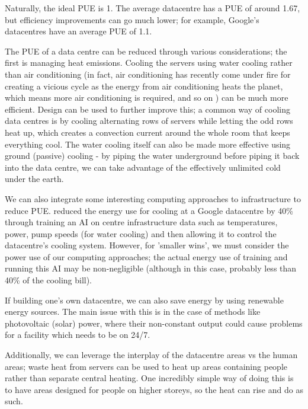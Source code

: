 \documentclass{article}
\begin{document}
Naturally, the ideal PUE is 1. The average datacentre has a PUE of around 1.67, but efficiency improvements can go much lower; for example, Google's datacentres have an average PUE of 1.1. \citep{holzle2020data}\newline

The PUE of a data centre can be reduced through various considerations; the first is managing heat emissions. Cooling the servers using water cooling rather than air conditioning (in fact, air conditioning has recently come under fire for creating a vicious cycle as the energy from air conditioning heats the planet, which means more air conditioning is required, and so on \citep{ospina2018cooling}) can be much more efficient. \citep{zhang2022cooling} Design can be used to further improve this; a common way of cooling data centres is by cooling alternating rows of servers while letting the odd rows heat up, which creates a convection current around the whole room that keeps everything cool. The water cooling itself can also be made more effective using ground (passive) cooling - by piping the water underground before piping it back into the data centre, we can take advantage of the effectively unlimited cold under the earth. \newline

We can also integrate some interesting computing approaches to infrastructure to reduce PUE. \citet{evans2016deepmind} reduced the energy use for cooling at a Google datacentre by 40\% through training an AI on centre infrastructure data such as temperatures, power, pump speeds (for water cooling) and then allowing it to control the datacentre's cooling system. However, for 'smaller wins', we must consider the power use of our computing approaches; the actual energy use of training and running this AI may be non-negligible (although in this case, probably less than 40\% of the cooling bill). \newline

If building one's own datacentre, we can also save energy by using renewable energy sources. The main issue with this is in the case of methods like photovoltaic (solar) power, where their non-constant output could cause problems for a facility which needs to be on 24/7.\newline

Additionally, we can leverage the interplay of the datacentre areas vs the human areas; waste heat from servers can be used to heat up areas containing people rather than separate central heating. One incredibly simple way of doing this is to have areas designed for people on higher storeys, so the heat can rise and do as such. \newline
\end{document}
